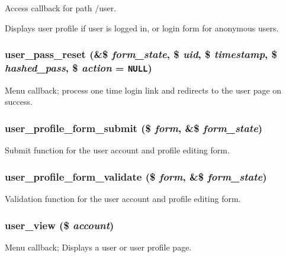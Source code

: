 Access callback for path /user.

Displays user profile if user is logged in, or login form for anonymous users. \hypertarget{user_8pages_8inc_b0f668164fa4eb84a181a32eb4d3a57f}{
\subsubsection[{user\_\-pass\_\-reset}]{\setlength{\rightskip}{0pt plus 5cm}user\_\-pass\_\-reset (\&\$ {\em form\_\-state}, \/  \$ {\em uid}, \/  \$ {\em timestamp}, \/  \$ {\em hashed\_\-pass}, \/  \$ {\em action} = {\tt NULL})}}
\label{user_8pages_8inc_b0f668164fa4eb84a181a32eb4d3a57f}


Menu callback; process one time login link and redirects to the user page on success. \hypertarget{user_8pages_8inc_c10455f162f61cbf551fe7ec7b5c92cc}{
\subsubsection[{user\_\-profile\_\-form\_\-submit}]{\setlength{\rightskip}{0pt plus 5cm}user\_\-profile\_\-form\_\-submit (\$ {\em form}, \/  \&\$ {\em form\_\-state})}}
\label{user_8pages_8inc_c10455f162f61cbf551fe7ec7b5c92cc}


Submit function for the user account and profile editing form. \hypertarget{user_8pages_8inc_fca5f516f0fadcb918e6d13dff66db76}{
\subsubsection[{user\_\-profile\_\-form\_\-validate}]{\setlength{\rightskip}{0pt plus 5cm}user\_\-profile\_\-form\_\-validate (\$ {\em form}, \/  \&\$ {\em form\_\-state})}}
\label{user_8pages_8inc_fca5f516f0fadcb918e6d13dff66db76}


Validation function for the user account and profile editing form. \hypertarget{user_8pages_8inc_f70d615c07069b8c6c9c68c1c3e132f7}{
\subsubsection[{user\_\-view}]{\setlength{\rightskip}{0pt plus 5cm}user\_\-view (\$ {\em account})}}
\label{user_8pages_8inc_f70d615c07069b8c6c9c68c1c3e132f7}


Menu callback; Displays a user or user profile page. 